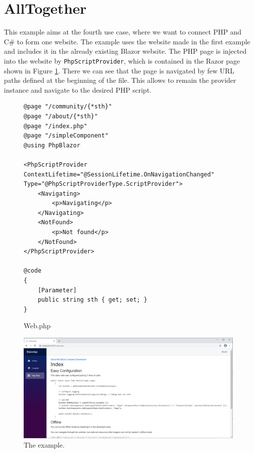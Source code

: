 \section{AllTogether}

This example aims at the fourth use case, where we want to connect PHP and C\# to form one website.
The example uses the website made in the first example and includes it in the already existing Blazor website.
The PHP page is injected into the website by \texttt{PhpScriptProvider}, which is contained in the Razor page shown in Figure \ref{img29:razor}.
There we can see that the page is navigated by few URL paths defined at the beginning of the file.
This allows to remain the provider instance and navigate to the desired PHP script.
\par
\begin{figure}[H]
\begin{lstlisting}
@page "/community/{*sth}"
@page "/about/{*sth}"
@page "/index.php"
@page "/simpleComponent"
@using PhpBlazor

<PhpScriptProvider ContextLifetime="@SessionLifetime.OnNavigationChanged" Type="@PhpScriptProviderType.ScriptProvider">
    <Navigating>
        <p>Navigating</p>
    </Navigating>
    <NotFound>
        <p>Not found</p>
    </NotFound>
</PhpScriptProvider>

@code
{
    [Parameter]
    public string sth { get; set; }
}
\end{lstlisting}
\caption{Web.php}
\label{img29:razor}
\end{figure}
\par
\begin{figure}[H]\centering
\includegraphics[scale=0.4]{./img/AllTogether}
\caption{The example.}
\label{img30:allTogether}
\end{figure} 